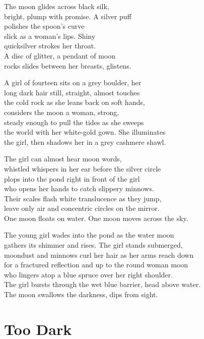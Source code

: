 \documentclass[twoside,10pt]{book}
\begin{document}
The moon glides across black silk,\\
bright, plump with promise. A silver puff\\
polishes the spoon's curve\\
slick as a woman's lips. Shiny\\
quicksilver strokes her throat.\\
A disc of glitter, a pendant of moon\\
rocks slides between her breasts, glistens.

A girl of fourteen sits on a grey boulder, her\\
long dark hair still, straight, almost touches\\
the cold rock as she leans back on soft hands,\\
considers the moon a woman, strong,\\
steady enough to pull the tides as she sweeps\\
the world with her white-gold gown. She illuminates\\
the girl, then shadows her in a grey cashmere shawl.

The girl can almost hear moon words,\\
whistled whispers in her ear before the silver circle\\
plops into the pond right in front of the girl\\
who opens her hands to catch slippery minnows.\\
Their scales flash white translucence as they jump,\\
leave only air and concentric circles on the mirror.\\
One moon floats on water. One moon moves across the sky.

The young girl wades into the pond as the water moon\\
gathers its shimmer and rises. The girl stands submerged,\\
moondust and minnows curl her hair as her arms reach down\\
for a fractured reflection and up to the round woman moon\\
who lingers atop a blue spruce over her right shoulder.\\
The girl bursts through the wet blue barrier, head above water.\\
The moon swallows the darkness, dips from sight.


\clearpage
\section{Too Dark}
\end{document}
